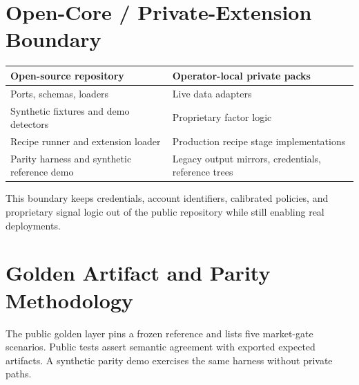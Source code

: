 \documentclass[11pt]{article}
\begin{document}
\section{Open-Core / Private-Extension Boundary}

\begin{center}
\begin{tabular}{ll}
\toprule
Open-source repository & Operator-local private packs \\
\midrule
Ports, schemas, loaders & Live data adapters \\
Synthetic fixtures and demo detectors & Proprietary factor logic \\
Recipe runner and extension loader & Production recipe stage implementations \\
Parity harness and synthetic reference demo & Legacy output mirrors, credentials, reference trees \\
\bottomrule
\end{tabular}
\end{center}

This boundary keeps credentials, account identifiers, calibrated policies, and proprietary signal
logic out of the public repository while still enabling real deployments.

\section{Golden Artifact and Parity Methodology}

The public golden layer pins a frozen reference and lists five market-gate scenarios. Public
tests assert semantic agreement with exported expected artifacts. A synthetic parity demo
exercises the same harness without private paths.
\end{document}
